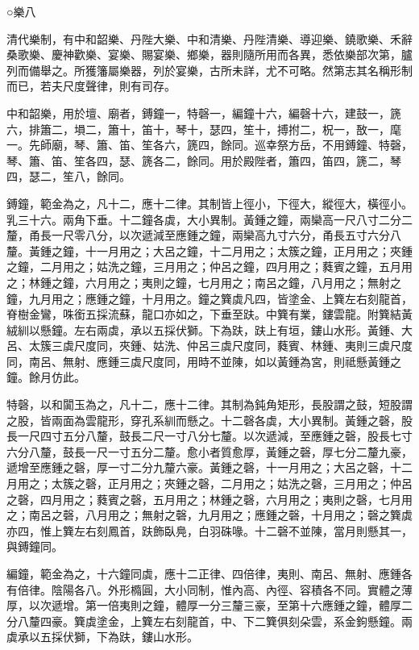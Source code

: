 
\begin{pinyinscope}
○樂八

清代樂制，有中和韶樂、丹陛大樂、中和清樂、丹陛清樂、導迎樂、鐃歌樂、禾辭桑歌樂、慶神歡樂、宴樂、賜宴樂、鄉樂，器則隨所用而各異，悉依樂部次第，臚列而備舉之。所獲籓屬樂器，列於宴樂，古所未詳，尤不可略。然第志其名稱形制而已，若夫尺度聲律，則有司存。

中和韶樂，用於壇、廟者，鎛鐘一，特磬一，編鐘十六，編磬十六，建鼓一，篪六，排簫二，塤二，簫十，笛十，琴十，瑟四，笙十，搏拊二，柷一，敔一，麾一。先師廟，琴、簫、笛、笙各六，篪四，餘同。巡幸祭方岳，不用鎛鐘、特磬，琴、簫、笛、笙各四，瑟、篪各二，餘同。用於殿陛者，簫四，笛四，篪二，琴四，瑟二，笙八，餘同。

鎛鐘，範金為之，凡十二，應十二律。其制皆上徑小，下徑大，縱徑大，橫徑小。乳三十六。兩角下垂。十二鐘各虡，大小異制。黃鍾之鐘，兩欒高一尺八寸二分二釐，甬長一尺零八分，以次遞減至應鍾之鐘，兩欒高九寸六分，甬長五寸六分八釐。黃鍾之鐘，十一月用之；大呂之鐘，十二月用之；太簇之鐘，正月用之；夾鍾之鐘，二月用之；姑洗之鐘，三月用之；仲呂之鐘，四月用之；蕤賓之鐘，五月用之；林鍾之鐘，六月用之；夷則之鐘，七月用之；南呂之鐘，八月用之；無射之鐘，九月用之；應鍾之鐘，十月用之。鐘之簨虡凡四，皆塗金、上簨左右刻龍首，脊樹金鸞，咮銜五採流蘇，龍口亦如之，下垂至趺。中簨有業，鏤雲龍。附簨結黃絨紃以懸鐘。左右兩虡，承以五採伏獅。下為趺，趺上有垣，鏤山水形。黃鍾、大呂、太簇三虡尺度同，夾鍾、姑洗、仲呂三虡尺度同，蕤賓、林鍾、夷則三虡尺度同，南呂、無射、應鍾三虡尺度同，用時不並陳，如以黃鍾為宮，則祗懸黃鍾之鐘。餘月仿此。

特磬，以和闐玉為之，凡十二，應十二律。其制為鈍角矩形，長股謂之鼓，短股謂之股，皆兩面為雲龍形，穿孔系紃而懸之。十二磬各虡，大小異制。黃鍾之磬，股長一尺四寸五分八釐，鼓長二尺一寸八分七釐。以次遞減，至應鍾之磬，股長七寸六分八釐，鼓長一尺一寸五分二釐。愈小者質愈厚，黃鍾之磬，厚七分二釐九豪，遞增至應鍾之磬，厚一寸二分九釐六豪。黃鍾之磬，十一月用之；大呂之磬，十二月用之；太簇之磬，正月用之；夾鍾之磬，二月用之；姑洗之磬，三月用之；仲呂之磬，四月用之；蕤賓之磬，五月用之；林鍾之磬，六月用之；夷則之磬，七月用之；南呂之磬，八月用之；無射之磬，九月用之；應鍾之磬，十月用之；磬之簨虡亦四，惟上簨左右刻鳳首，趺飾臥鳧，白羽硃喙。十二磬不並陳，當月則懸其一，與鎛鐘同。

編鐘，範金為之，十六鐘同虡，應十二正律、四倍律，夷則、南呂、無射、應鍾各有倍律。陰陽各八。外形橢圓，大小同制，惟內高、內徑、容積各不同。實體之薄厚，以次遞增。第一倍夷則之鐘，體厚一分三釐三豪，至第十六應鍾之鐘，體厚二分八釐四豪。簨虡塗金，上簨左右刻龍首，中、下二簨俱刻朵雲，系金鉤懸鐘。兩虡承以五採伏獅，下為趺，鏤山水形。


\end{pinyinscope}

